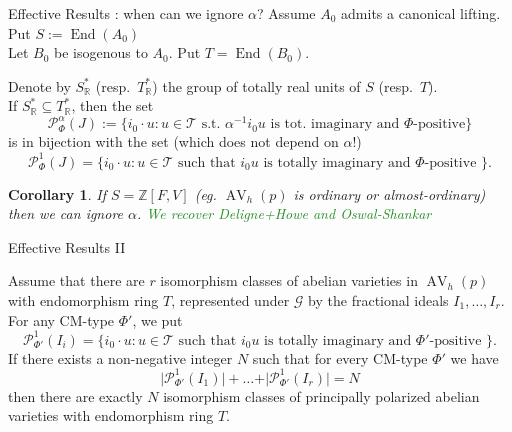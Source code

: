 \documentclass[usenames,dvipsnames]{beamer}
\def\Z{\mathbb{Z}}
\def\R{\mathbb{R}}
\DeclareMathOperator{\AV}{AV}
\DeclareMathOperator{\End}{End}
\newcommand{\cG}{\mathcal{G}}
\newcommand{\Palpha}[2]{\mathcal{P}^{\alpha}_{{#1}}({#2})}
\newcommand{\Pone}[2]{\mathcal{P}^{1}_{{#1}}({#2})}
\newcommand{\green}[1]{\textcolor{ForestGreen}{#1}}
\newtheorem{cor}[df]{Corollary}
\begin{document}
\begin{frame}{ Effective Results : when can we ignore $\alpha$? }
    Assume $A_0$ admits a canonical lifting. Put $S:=\End(A_0)$\\
    Let $B_0$ be isogenous to $A_0$. Put $T=\End(B_0)$.
\pause      
	\begin{theorem}[ 1 ]
		Denote by $S^*_\R$ (resp.~$T^*_\R$) the group of totally real units of $S$ (resp.~$T$).\\
\pause 
		If $S^*_\R\subseteq T^*_\R$, then the set
		\[ \Palpha{\Phi}{J}:=\{ i_0 \cdot u  : u \in \mathcal{T} \text{ s.t.~} \alpha^{-1} i_0 u \text{ is tot.~imaginary and } \Phi\text{-positive} \} \]
\pause 
	    is in bijection with the set (which does not depend on $\alpha$!)
        \[ \Pone{\Phi}{J}=\{ i_0 \cdot u: u \in \mathcal{T} \text{ such that } i_0 u \text{ is totally imaginary and $\Phi$-positive } \}. \]
	\end{theorem}
\pause 
	\begin{cor}
    If $S=\Z[F,V]$ (eg. $\AV_h(p)$ is ordinary or almost-ordinary) then we can ignore $\alpha$.
\pause 
    \green{We recover Deligne+Howe and Oswal-Shankar}
	\end{cor}
\end{frame}

\begin{frame}{ Effective Results II }
	\begin{theorem}[2]
    Assume that there are $r$ isomorphism classes of abelian varieties in $\AV_h(p)$ with endomorphism ring $T$, represented under $\cG$ by the fractional ideals  $I_1,\ldots,I_r$.
    For any CM-type $\Phi'$, we put
		\[ \Pone{\Phi'}{I_i}=\{ i_0 \cdot u: u \in \mathcal{T} \text{ such that } i_0 u \text{ is totally imaginary and $\Phi'$-positive } \}. \]
    If there exists a non-negative integer $N$ such that for every CM-type $\Phi'$ we have
    \[
    \vert \Pone{\Phi'}{I_1} \vert + \ldots + \vert \Pone{\Phi'}{I_r} \vert = N
    \]
    then there are exactly $N$ isomorphism classes of principally polarized abelian varieties with endomorphism ring $T$. 
	\end{theorem}
\end{frame}
\end{document}
